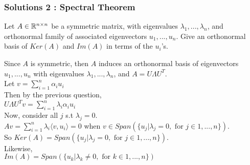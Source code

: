 \documentclass{beamer}
\renewenvironment{enumerate}%
{\begin{list}{\arabic{enumi}.}%
      {\setlength{\leftmargin}{2.5em}%
       \setlength{\itemsep}{-\parsep}%
       \setlength{\topsep}{-\parskip}%
       \usecounter{enumi}}%
 }{\end{list}}
\begin{document}
\begin{frame}
\frametitle{Solutions 2 : Spectral Theorem}

\begin{enumerate}
\item[2.] Let $A\in\mathbb{R}^{n\times n}$ be a symmetric matrix, with eigenvalues $\lambda_1,...,\lambda_n$, and orthonormal family of associated eigenvectors $u_1,...,u_n$. Give an orthonormal basis of $Ker(A)$ and $Im(A)$ in terms of the $u_i$'s.
\begin{solution}
Since $A$ is symmetric, then $A$ induces an orthonormal basis of eigenvectors $u_1,...,u_n$ with eigenvalues $\lambda_1,...,\lambda_n$, and $A = U\Lambda U^T$.\\
Let $v = \sum_{i=1}^n \alpha_i u_i$ \\  
Then by the previous question,\\
\qquad $U \Lambda U^Tv = \sum_{i=1}^n \lambda_i \alpha_i u_i$ \\
Now, consider all $j$ s.t $\lambda_j = 0$. \\
$Av = \sum_{i=1}^n \lambda_i \langle v,u_i\rangle = 0$ when $v \in Span(\{u_j| \lambda_j=0,\text{ for } j\in 1,...,n\})$.\\
So $Ker(A) = Span(\{u_j| \lambda_j=0,\text{ for }j\in 1,...,n\})$.\\
Likewise,\\ 
$Im(A) = Span(\{u_k | \lambda_k \neq 0,\text{ for } k\in 1,...,n\} )$

\end{solution}

\end{enumerate}
\end{frame}
\end{document}
